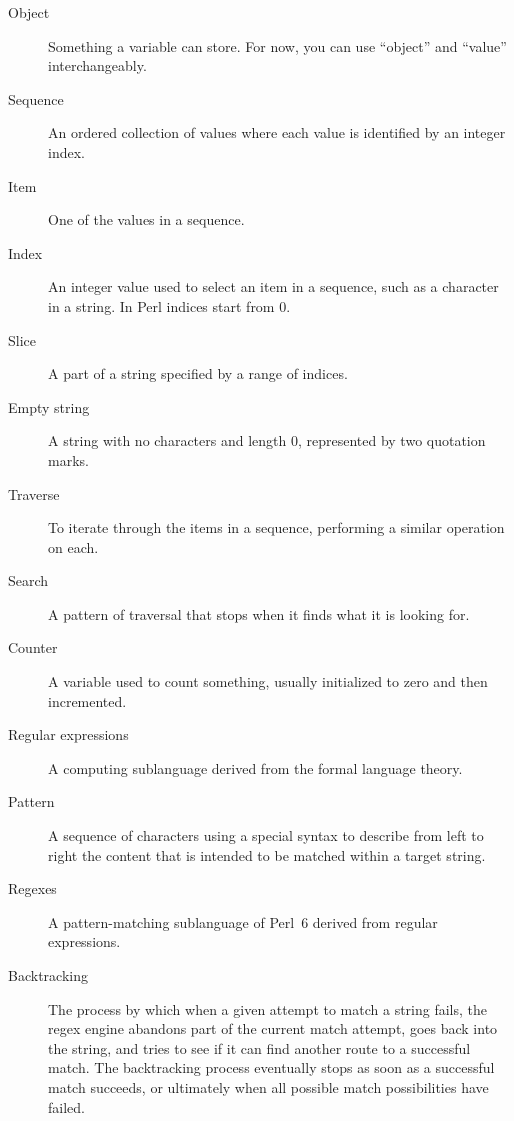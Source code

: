 \begin{description}

\item[Object] Something a variable can store.  For now,
you can use ``object'' and ``value'' interchangeably.

\item[Sequence] An ordered collection of
values where each value is identified by an integer index.

\item[Item] One of the values in a sequence.

\item[Index] An integer value used to select an item in
a sequence, such as a character in a string.  In Perl
indices start from 0.

\item[Slice] A part of a string specified by a range of indices.

\item[Empty string] A string with no characters and length 0, represented
by two quotation marks.

\item[Traverse] To iterate through the items in a sequence,
performing a similar operation on each.

\item[Search] A pattern of traversal that stops
when it finds what it is looking for.

\item[Counter] A variable used to count something, usually initialized
to zero and then incremented.

\item[Regular expressions] A computing sublanguage derived 
from the formal language theory.

\item[Pattern] A sequence of characters using a special 
syntax to describe from left to right the content that 
is intended to be matched within a target string.

\item[Regexes] A pattern-matching sublanguage of Perl~6 
derived from regular expressions.

\item[Backtracking] The process by which when a given attempt 
to match a string fails, the regex engine abandons part of 
the current match attempt, goes back into the string, and 
tries to see if it can find another route to a successful 
match. The backtracking process eventually stops as soon 
as a successful match succeeds, or ultimately when all 
possible match possibilities have failed.

\end{description}


